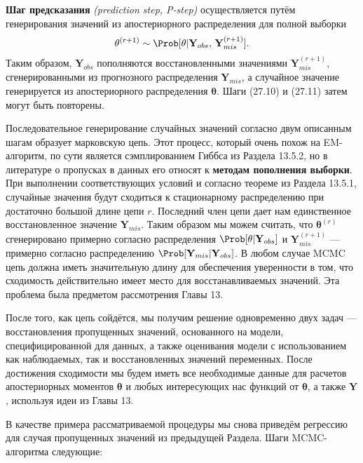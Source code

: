 {\bf Шаг предсказания} \emph{(prediction step, P-step)} осуществляется путём генерирования значений из апостериорного распределения для полной выборки
\begin{equation}
\mathbf{\theta}^{(r+1)} \sim \Prob[\mathbf{\theta}|\mathbf{Y}_{obs}, \, \mathbf{Y}_{mis}^{(r+1)}].
\end{equation}
Таким образом, $\mathbf{Y}_{obs}$ пополняются восстановленными значениями $\mathbf{Y}_{mis}^{(r+1)}$, сгенерированными из прогнозного распределения $\mathbf{Y}_{mis}$, а случайное значение генерируется из апостериорного распределения $\mathbf{\theta}$. Шаги (27.10) и (27.11) затем могут быть повторены.

Последовательное генерирование случайных значений согласно двум описанным шагам образует марковскую цепь. Этот процесс, который очень похож на EM-алгоритм, по сути является сэмплированием Гиббса из Раздела 13.5.2, но в литературе о пропусках в данных его относят к {\bf методам пополнения выборки}. При выполнении соответствующих условий и согласно теореме из Раздела 13.5.1, случайные значения будут сходиться к стационарному распределению при достаточно большой длине цепи $r$. Последний член цепи дает нам единственное восстановленное значение $\mathbf{Y}_{mis}$. Таким образом мы можем считать, что  $\mathbf{\theta}^{(r)}$ сгенерировано примерно согласно распределения $\Prob[\mathbf{\theta}|\mathbf{Y}_{obs}]$ и $\mathbf{Y}_{mis}^{(r+1)}$ --- примерно согласно распределению $\Prob[\mathbf{Y}_{mis}|\mathbf{Y}_{obs}]$. В любом случае MCMC цепь должна иметь значительную длину для обеспечения уверенности в том, что сходимость действительно имеет место для восстанавливаемых значений. Эта проблема была предметом рассмотрения Главы 13.

После того, как цепь сойдётся, мы получим решение одновременно двух задач --- восстановления пропущенных значений, основанного на модели, специфицированной для данных, а также оценивания модели с использованием как наблюдаемых, так и восстановленных значений переменных. После достижения сходимости мы будем иметь все необходимые данные для расчетов апостериорных моментов $\mathbf{\theta}$ и любых интересующих нас функций от $\mathbf{\theta}$, а также $\mathbf{Y}$, используя идеи из Главы 13.

В качестве примера рассматриваемой процедуры мы снова приведём  регрессию для случая пропущенных значений из предыдущей Раздела. Шаги MCMC-алгоритма следующие:

